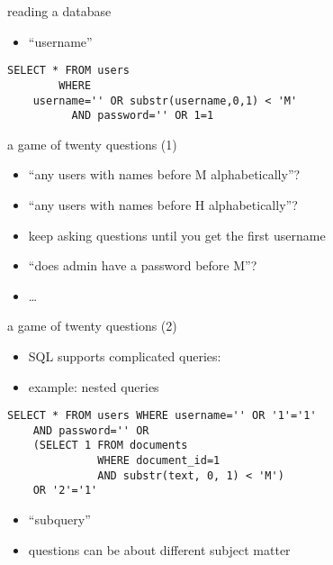 \begin{frame}[fragile,label=readDB2]{reading a database}
    \begin{itemize}
        \item ``username'' 
    \end{itemize}
\begin{verbatim}
SELECT * FROM users
        WHERE
    username='' OR substr(username,0,1) < 'M'
          AND password='' OR 1=1
\end{verbatim}
\end{frame}

\begin{frame}[fragile,label=twentyQ]{a game of twenty questions (1)}
    \begin{itemize}
    \item ``any users with names before M alphabetically''?
    \item ``any users with names before H alphabetically''?
    \item keep asking questions until you get the first username
    \vspace{.5cm}
    \item<2> ``does admin have a password before M''?
    \item<2> \ldots
    \end{itemize}
\end{frame}

\begin{frame}[fragile,label=twentyQ2]{a game of twenty questions (2)}
    \begin{itemize}
    \item SQL supports complicated queries:
    \item example: nested queries
    \end{itemize}
\begin{verbatim}
SELECT * FROM users WHERE username='' OR '1'='1'
    AND password='' OR
    (SELECT 1 FROM documents
              WHERE document_id=1
              AND substr(text, 0, 1) < 'M')
    OR '2'='1'
\end{verbatim}
    \begin{itemize}
    \item ``subquery''
    \item questions can be about different subject matter
    \end{itemize}
\end{frame}

